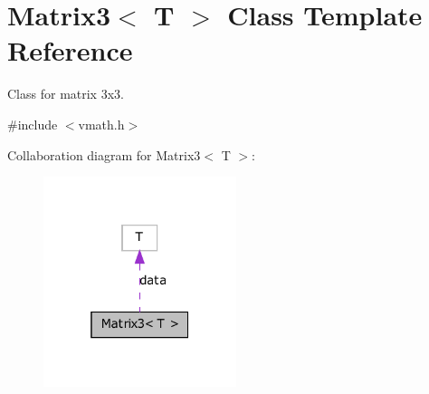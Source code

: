 \hypertarget{class_matrix3}{
\section{Matrix3$<$ T $>$ Class Template Reference}
\label{class_matrix3}
}


Class for matrix 3x3.  




{\ttfamily \#include $<$vmath.h$>$}



Collaboration diagram for Matrix3$<$ T $>$:
\nopagebreak
\begin{figure}[H]
\begin{center}
\leavevmode
\includegraphics[width=160pt]{class_matrix3__coll__graph}
\end{center}
\end{figure}
